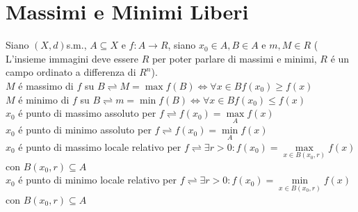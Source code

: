 \section{Massimi e Minimi Liberi}
Siano $(X,d)$s.m., $A\subseteq X$ e $f:A\rightarrow R$, siano $x_0\in A, B\in A$ e $m,M\in R$ ( L'insieme immagini deve essere $R$ per poter parlare di massimi e minimi, $R$ \'e un campo ordinato a differenza di $R^n$).\\
$M$ \'e massimo di $f$ su $B \rightleftharpoons M=\max f(B)\Leftrightarrow\forall x \in B f(x_0)\ge f(x)$\\
$M$ \'e minimo di $f$ su $B \rightleftharpoons m=\min f(B)\Leftrightarrow\forall x \in B f(x_0)\le f(x)$\\
$x_0$ \'e punto di massimo assoluto per $f \rightleftharpoons f(x_0)=\max\limits_{A}f(x)$\\
$x_0$ \'e punto di minimo assoluto per $f \rightleftharpoons f(x_0)=\min\limits_{A}f(x)$\\
$x_0$ \'e punto di massimo locale relativo per $f \rightleftharpoons \exists r>0: f(x_0)=\max\limits_{x\in B(x_0,r)}f(x)$ con $B(x_0,r)\subseteq A$\\
$x_0$ \'e punto di minimo locale relativo per $f \rightleftharpoons \exists r>0: f(x_0)=\min\limits_{x\in B(x_0,r)}f(x)$ con $B(x_0,r)\subseteq A$\\
